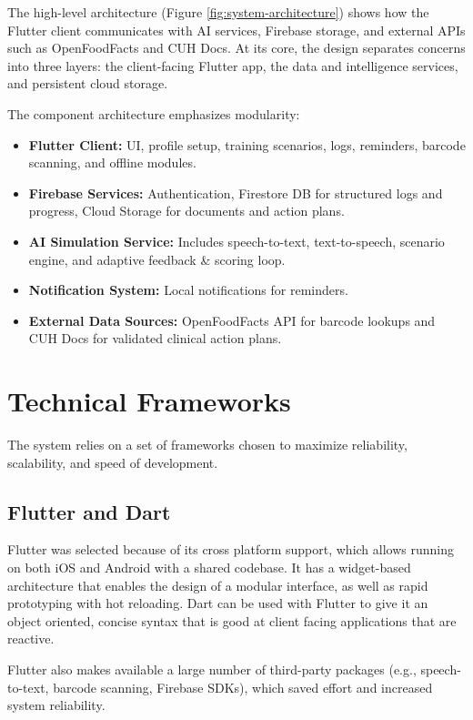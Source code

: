 \documentclass[MScCS]{uccthesis}
\begin{document}
The high-level architecture (Figure \ref{fig:system-architecture}) shows how the Flutter client communicates with AI services, Firebase storage, and external APIs such as OpenFoodFacts and CUH Docs. At its core, the design separates concerns into three layers: the client-facing Flutter app, the data and intelligence services, and persistent cloud storage.  


The component architecture emphasizes modularity:
\begin{itemize}
    \item \textbf{Flutter Client:} UI, profile setup, training scenarios, logs, reminders, barcode scanning, and offline modules.
    \item \textbf{Firebase Services:} Authentication, Firestore DB for structured logs and progress, Cloud Storage for documents and action plans.
    \item \textbf{AI Simulation Service:} Includes speech-to-text, text-to-speech, scenario engine, and adaptive feedback \& scoring loop.
    \item \textbf{Notification System:} Local notifications for reminders.
    \item \textbf{External Data Sources:} OpenFoodFacts API for barcode lookups and CUH Docs for validated clinical action plans.
\end{itemize}

\section{Technical Frameworks}
The system relies on a set of frameworks chosen to maximize reliability, scalability, and speed of development.  

\subsection{Flutter and Dart}
Flutter was selected because of its cross platform support, which allows running on both iOS and Android with a shared codebase. It has a widget-based architecture that enables the design of a modular interface, as well as rapid prototyping with hot reloading. Dart can be used with Flutter to give it an object oriented, concise syntax that is good at client facing applications that are reactive.

Flutter also makes available a large number of third-party packages (e.g., speech-to-text, barcode scanning, Firebase SDKs), which saved effort and increased system reliability.
\end{document}
